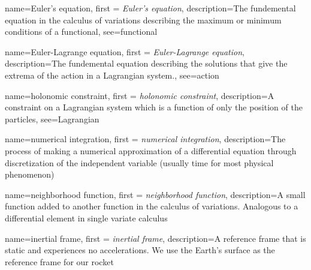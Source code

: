 


{
    name=Euler's equation,
    first = {\textit{Euler's equation}},
    description={The fundemental equation in the calculus of variations describing the maximum or minimum conditions of a functional},
    see={functional}
}

{
    name=Euler-Lagrange equation,
    first = {\textit{Euler-Lagrange equation}},
    description={The fundemental equation describing the solutions that give the extrema of the action in a Lagrangian system.},
    see={action}
}

{
    name=holonomic constraint,
    first = {\textit{holonomic constraint}},
    description={A constraint on a Lagrangian system which is a function of only the position of the particles},
    see={Lagrangian}
}


{
    name=numerical integration,
    first = {\textit{numerical integration}},
    description={The process of making a numerical approximation of a differential equation through discretization of the independent variable (usually time for most physical phenomenon)}
}

{
    name=neighborhood function,
    first = {\textit{neighborhood function}},
    description={A small function added to another function in the calculus of variations. Analogous to a differential element in single variate calculus}
}







{
    name=inertial frame,
    first = {\textit{inertial frame}},
    description={A reference frame that is static and experiences no accelerations. We use the Earth's surface as the reference frame for our rocket}
}

